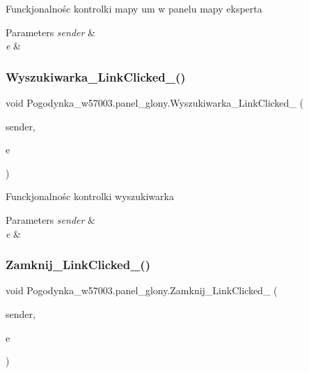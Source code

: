 Funckjonalnośc kontrolki mapy um w panelu mapy eksperta 


\begin{DoxyParams}{Parameters}
{\em sender} & \\
\hline
{\em e} & \\
\hline
\end{DoxyParams}
\mbox{\label{class_pogodynka__w57003_1_1panel__glony_ac3892cf16a3589e5578defe1786710e0}} 
\subsubsection{\texorpdfstring{Wyszukiwarka\+\_\+\+Link\+Clicked\+\_()}{Wyszukiwarka\_LinkClicked\_1()}}
{\footnotesize\ttfamily void Pogodynka\+\_\+w57003.\+panel\+\_\+glony.\+Wyszukiwarka\+\_\+\+Link\+Clicked\+\_ (\begin{DoxyParamCaption}\item[{object}]{sender,  }\item[{Link\+Label\+Link\+Clicked\+Event\+Args}]{e }\end{DoxyParamCaption})\hspace{0.3cm}{\ttfamily [private]}}



Funckjonalnośc kontrolki wyszukiwarka 


\begin{DoxyParams}{Parameters}
{\em sender} & \\
\hline
{\em e} & \\
\hline
\end{DoxyParams}
\mbox{\label{class_pogodynka__w57003_1_1panel__glony_a8d32fcf8f9a2d131dc124427170bc84c}} 
\subsubsection{\texorpdfstring{Zamknij\+\_\+\+Link\+Clicked\+\_()}{Zamknij\_LinkClicked\_1()}}
{\footnotesize\ttfamily void Pogodynka\+\_\+w57003.\+panel\+\_\+glony.\+Zamknij\+\_\+\+Link\+Clicked\+\_ (\begin{DoxyParamCaption}\item[{object}]{sender,  }\item[{Link\+Label\+Link\+Clicked\+Event\+Args}]{e }\end{DoxyParamCaption})\hspace{0.3cm}{\ttfamily [private]}}



